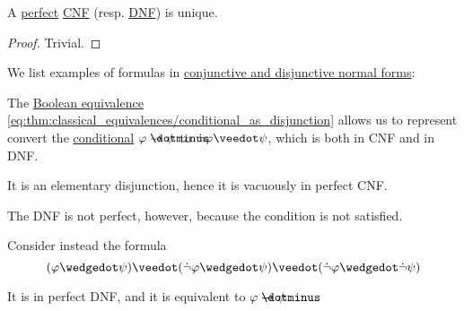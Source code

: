 \begin{proposition}\label{thm:perfect_cnf_and_dnf_uniqueness}
  A \hyperref[def:perfect_cnf_and_dnf]{perfect} \hyperref[def:cnf_and_dnf]{CNF} (resp. \hyperref[def:cnf_and_dnf]{DNF}) is unique.
\end{proposition}
\begin{proof}
  Trivial.
\end{proof}

\begin{example}\label{ex:def:cnf_and_dnf}
  We list examples of formulas in \hyperref[def:cnf_and_dnf]{conjunctive and disjunctive normal forms}:
  \begin{thmenum}
     The \hyperref[thm:classical_equivalences]{Boolean equivalence} \eqref{eq:thm:classical_equivalences/conditional_as_disjunction} allows us to represent convert the \hyperref[def:propositional_alphabet/connectives/conditional]{conditional} \( \varphi \synimplies \psi \) to \( \synneg \varphi \synvee \psi \), which is both in CNF and in DNF.

    It is an elementary disjunction, hence it is vacuously in perfect CNF.

    The DNF is not perfect, however, because the condition  is not satisfied.

     Consider instead the formula
    \begin{equation*}
      (\varphi \synwedge \psi) \synvee (\synneg \varphi \synwedge \psi) \synvee (\synneg \varphi \synwedge \synneg \psi)
    \end{equation*}

    It is in perfect DNF, and it is equivalent to \( \varphi \synimplies \psi \).
  \end{thmenum}
\end{example}

